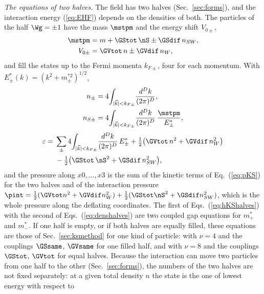\emph{The equations of two halves.} The field has two halves (Sec.~\ref{sec:forms}), and the
interaction energy (\ref{eq:EHF}) depends on the densities of both. The particles of the half
$\Wg=\pm1$ have the mass $\mstpm$ and the energy shift $V_{0\pm}$,
\begin{equation}
\begin{aligned}
\mstpm&=m+\GStot\,\nS\pm\GSdif\,n_{SW},\\
V_{0\pm}&=\GVtot\,n\pm\GVdif\,n_W ,
\end{aligned}
\label{eq:hKShalves}
\end{equation}
and fill the states up to the Fermi momenta $k_{F\pm}$, four for each momentum. With
$E^{*}_\pm(k)=(k^{2}+m_\pm^{*2})^{1/2}$,
\begin{equation}
\begin{aligned}
n_\pm&=4\!\int_{|\vec k|<k_{F\pm}}\!\frac{d^{D}k}{(2\pi)^{D}},\\
n_{S\pm}&=4\!\int_{|\vec k|<k_{F\pm}}\!\frac{d^{D}k}{(2\pi)^{D}}\,\frac{\mstpm}{E^{*}_\pm},
\end{aligned}
\label{eq:denshalves}
\end{equation}
\begin{equation}
\begin{aligned}
\varepsilon={}&\sum_\pm4\!\int_{|\vec k|<k_{F\pm}}\!\frac{d^{D}k}{(2\pi)^{D}}\,E^{*}_\pm
+\tfrac12\big(\GVtot\,n^{2}+\GVdif\,n_W^{2}\big)\\
&-\tfrac12\big(\GStot\,\nS^{2}+\GSdif\,n_{SW}^{2}\big),
\end{aligned}
\label{eq:epshalves}
\end{equation}
and the pressure along $x0,\dots,x3$ is the sum of the kinetic terms of Eq.~(\ref{eq:pKS}) for the two
halves and of the interaction pressure
$\pint=\tfrac12(\GVtot n^{2}+\GVdif n_W^{2})+\tfrac12(\GStot\nS^{2}+\GSdif n_{SW}^{2})$, which is the
whole pressure along the deflating coordinates. The first of Eqs.~(\ref{eq:hKShalves}) with the second
of Eqs.~(\ref{eq:denshalves}) are two coupled gap equations for $m^{*}_+$ and $m^{*}_-$. If one half is
empty, or if both halves are equally filled, these equations are those of Sec.~\ref{sec:ksmethod} for
one kind of particle: with $\nu=4$ and the couplings $\GSsame$, $\GVsame$ for one filled half, and
with $\nu=8$ and the couplings $\GStot$, $\GVtot$ for equal halves. Because the interaction can move
two particles from one half to the other (Sec.~\ref{sec:forms}), the numbers of the two halves are not
fixed separately: at a given total density $n$ the state is the one of lowest energy with respect to
